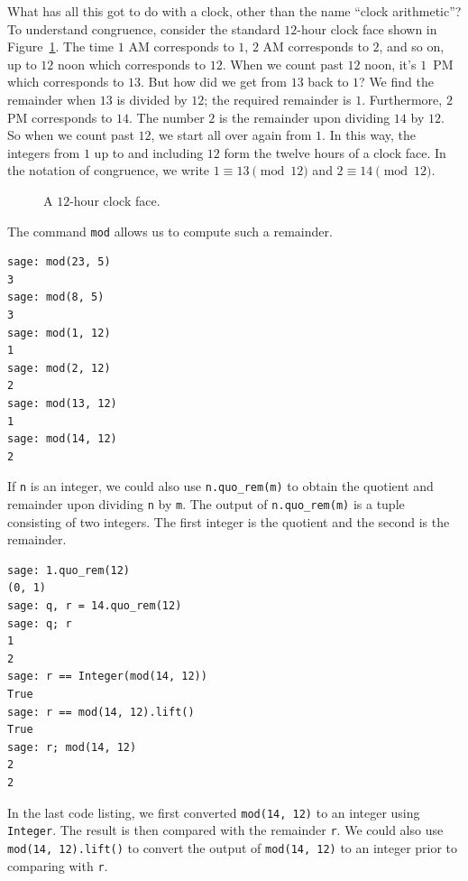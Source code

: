 What has all this got to do with a clock, other than the name
``clock arithmetic''? To understand congruence, consider the standard
$12$-hour clock face shown in
Figure~\ref{fig:number_theory:12_hour_clock_face}. The time $1$ AM
corresponds to $1$, $2$ AM corresponds to $2$, and so on, up to $12$
noon which corresponds to $12$. When we count past $12$ noon, it's
$1$~PM which corresponds to $13$. But how did we get from $13$ back to
$1$? We find the remainder when $13$ is divided by $12$; the required
remainder is $1$. Furthermore, $2$ PM corresponds to $14$. The number
$2$ is the remainder upon dividing $14$ by $12$. So when we count past
$12$, we start all over again from $1$. In this way, the integers from
$1$ up to and including $12$ form the twelve hours of a clock face. In
the notation of congruence, we write $1 \equiv 13 \pmod{12}$ and
$2 \equiv 14 \pmod{12}$.

\begin{figure}[!htbp]
\centering
{}
\caption{A $12$-hour clock face.}
\label{fig:number_theory:12_hour_clock_face}
\end{figure}

The command \verb!mod!\index{$\bmod$} allows us to compute such a
remainder.

\begin{lstlisting}
sage: mod(23, 5)
3
sage: mod(8, 5)
3
sage: mod(1, 12)
1
sage: mod(2, 12)
2
sage: mod(13, 12)
1
sage: mod(14, 12)
2
\end{lstlisting}

If \verb!n! is an integer, we could also use \verb!n.quo_rem(m)! to
obtain the quotient and remainder
upon dividing \verb!n! by \verb!m!. The output of \verb!n.quo_rem(m)!
is a tuple consisting of two integers. The first integer is the
quotient and the second is the remainder.
%
\begin{lstlisting}
sage: 1.quo_rem(12)
(0, 1)
sage: q, r = 14.quo_rem(12)
sage: q; r
1
2
sage: r == Integer(mod(14, 12))
True
sage: r == mod(14, 12).lift()
True
sage: r; mod(14, 12)
2
2
\end{lstlisting}
%
In the last code listing, we first converted \verb!mod(14, 12)! to an
integer using \verb!Integer!. The result is then compared with the
remainder \verb!r!. We could also use \verb!mod(14, 12).lift()! to
convert the output of \verb!mod(14, 12)! to an integer prior to
comparing with \verb!r!.


